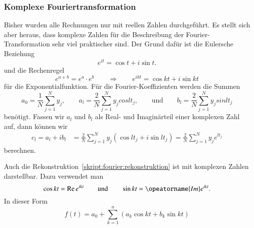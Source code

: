 %
%
%
\subsubsection{Komplexe Fouriertransformation}
Bisher wurden alle Rechnungen nur mit reellen Zahlen durchgeführt.
Es stellt sich aber heraus, dass komplexe Zahlen für die Beschreibung
der Fourier-Transformation sehr viel praktischer sind.
Der Grund dafür ist die Eulersche Beziehung
\[
e^{it} = \cos t + i \sin t.
\]
und die Rechenregel
\[
e^{a+b}=e^a\cdot e^b
\qquad\Rightarrow\qquad
e^{ikt}=\cos kt+i\sin kt
\]
für die Exponentialfunktion.
Für die Fourier-Koeffizienten werden die Summen
\[
a_0
=
\frac{1}{N}\sum_{j=1}^N y_j,\qquad
a_l
=
\frac{2}{N}\sum_{j=1}^N y_j cos lt_j,
\qquad\text{und}\qquad
b_l
=
\frac{2}{N}\sum_{j=1}^N y_j sin lt_j
\]
benötigt.
Fassen wir $a_l$ und $b_l$ als Real- und Imaginärteil einer komplexen
Zahl auf, dann können wir 
\begin{align*}
c_l
=
a_l+ib_l
&=
\frac2{N} \sum_{j=1}^N y_j (\cos lt_j + i \sin lt_j)
=
\frac2{N} \sum_{j=1}^N y_j e^{lt_j}
\end{align*}
berechnen.

Auch die Rekonstruktion~\eqref{skript:fourier:rekonstruktion} ist
mit komplexen Zahlen darstellbar.
Dazu verwendet man 
\[
\cos kt = \operatorname{Re} e^{ikt}
\qquad\text{und}\qquad
\sin kt = \opeatorname{Im} e^{ikt}.
\]
In dieser Form
\[
f(t)
=
a_0
+\sum_{k=1}^n (a_k \cos kt + b_k \sin kt)
\]




